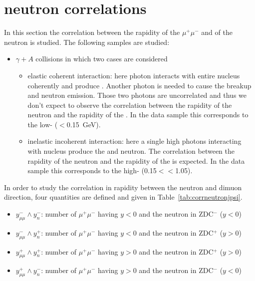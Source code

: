   \section{\JPsi{} neutron correlations~\label{sec:upcCor}}
    In this section the correlation between the rapidity of the $\mu^{+}\mu^{-}$ 
      and of the neutron is studied. The following samples are studied: 
    \begin{itemize}
      \item $\gamma + A$ collisions in which two cases are considered
      \begin{itemize}
        \item elastic coherent interaction: here photon interacts with entire
          nucleus coherently and produce \JPsi. 
          Another photon is needed to cause the breakup and neutron emission. 
          Those two photons are uncorrelated and thus we don't expect to 
            observe the correlation between the rapidity of the neutron and the
            rapidity of the \JPsi.
          In the data sample this corresponds to the low-\pt \JPsi 
            (\pt$<$0.15~GeV). 
        \item inelastic incoherent interaction: here a single high \pt photons
          interacting with nucleus produce the \JPsi and neutron. 
          The correlation between the rapidity of the neutron and the rapidity
            of the \JPsi is expected.
          In the data sample this corresponds to the high-\pt \JPsi 
            (0.15$<$\pt$<$1.05). 
      \end{itemize}
    \end{itemize}

    In order to study the correlation in rapidity between the neutron and
      dimuon direction, four quantities are defined and given in 
      Table~\ref{tab:corrneutronjpsi}.  
    \begin{itemize}
      \item $y^{-}_{\mu\mu} \wedge y_{n}^{-}$: number of $\mu^{+}\mu^{-}$ having
         $y<0$ and the neutron in ZDC$^{-}$ ($y<0$)
      \item $y^{-}_{\mu\mu} \wedge y_{n}^{+}$: number of $\mu^{+}\mu^{-}$ having
         $y<0$ and the neutron in ZDC$^{+}$ ($y>0$)
      \item $y^{+}_{\mu\mu} \wedge y_{n}^{+}$: number of $\mu^{+}\mu^{-}$ having
         $y>0$ and the neutron in ZDC$^{+}$ ($y>0$)
      \item $y^{+}_{\mu\mu} \wedge y_{n}^{-}$: number of $\mu^{+}\mu^{-}$ having
         $y>0$ and the neutron in ZDC$^{-}$ ($y<0$)
    \end{itemize}

